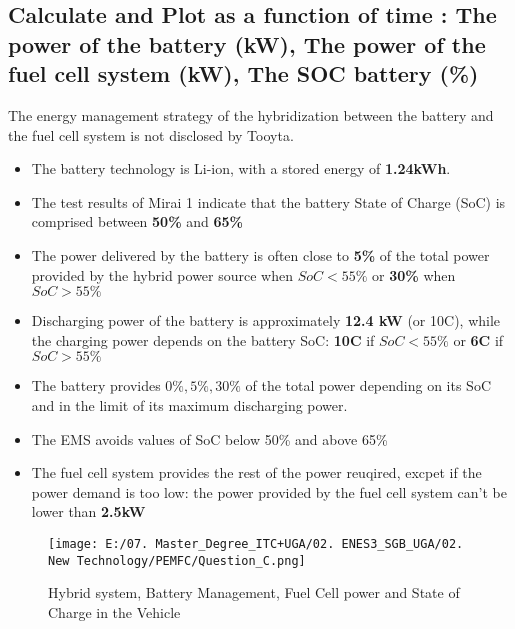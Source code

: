 \documentclass[12pt,a4paper]{article}
\numberwithin{equation}{section}
\begin{document}
{%

\subsection{Calculate and Plot as a function of time : The power of the battery (kW), The power of the fuel cell system (kW), The SOC battery (\%) }	

The energy management strategy of the hybridization between the battery and the fuel cell system is not disclosed by Tooyta. 
\begin{itemize}
	\item The battery technology is Li-ion, with a stored energy of \textbf{1.24kWh}.
	\item The test results of Mirai 1 indicate that the battery State of Charge (SoC) is comprised between \textbf{50\%} and \textbf{65\%}
	\item The power delivered by the battery is often close to \textbf{5\%} of the total power provided by the hybrid power source when $SoC < 55\%$ or \textbf{30\%} when $SoC > 55\%$
	\item Discharging power of the battery is approximately \textbf{12.4 kW} (or 10C), while the charging power depends on the battery SoC: \textbf{10C} if $SoC < 55\%$ or \textbf{6C} if $SoC > 55\%$
	\item The battery provides $0\%, 5\%, 30\%$ of the total power depending on its SoC and in the limit of its maximum discharging power.
	\item The EMS avoids values of SoC below 50\% and above 65\%
	\item The fuel cell system provides the rest of the power reuqired, excpet if the power demand is too low: the power provided by the fuel cell system can't be lower than \textbf{2.5kW}
\end{itemize}  

	\begin{figure}[h]
	\centering 
	\texttt{[image: E:/07. Master\_Degree\_ITC+UGA/02. ENES3\_SGB\_UGA/02. New Technology/PEMFC/Question\_C.png]}
	\caption{\small {Hybrid system, Battery Management, Fuel Cell power and State of Charge in the Vehicle}}
	\label{8}
	\end{figure}

}
\end{document}
